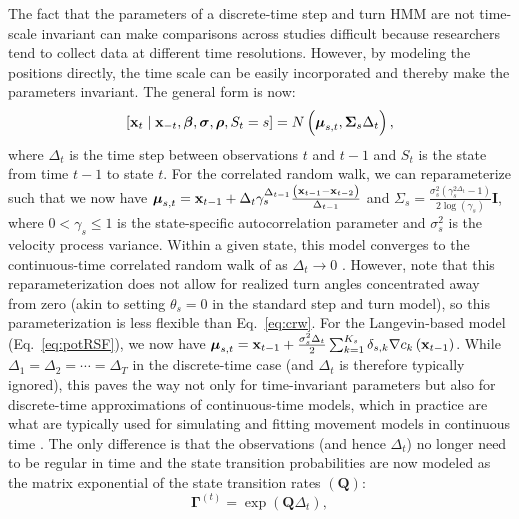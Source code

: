\documentclass[12pt]{article}\usepackage[]{graphicx}\usepackage[]{xcolor}
\begin{document}
The fact that the parameters of a discrete-time step and turn HMM are not time-scale invariant can make comparisons across studies difficult because researchers tend to collect data at different time resolutions. However, by modeling the positions directly, the time scale can be easily incorporated and thereby make the parameters invariant. The general form is now:
\begin{equation}
\label{eq:disApprox}
    [{\bf x}_t \mid {\bf x}_{-t}, \boldsymbol{\beta}, {\boldsymbol \sigma}, {\boldsymbol \rho}, S_t=s] = N\left(\boldsymbol{\mu}_{s,t},{\boldsymbol \Sigma}_s \Delta_t \right),
\end{equation}
where $\Delta_t$ is the time step between observations $t$ and $t-1$ and $S_t$ is the state from time $t-1$ to state $t$. For the correlated random walk, we can reparameterize such that we now have $\boldsymbol{\mu}_{s,t}={\bf x}_{t-1}+\Delta_t \gamma_s^{\Delta_{t-1}} \frac{\left({\bf x}_{t-1}-{\bf x}_{t-2}\right)}{\Delta_{t-1}}$ and $\Sigma_s=\frac{\sigma^2_s \left(\gamma_s^{2 \Delta_t}-1\right)}{2 \log \left(\gamma_s\right)} \mathbf{I}$, where $0 < \gamma_s \leq 1$ is the state-specific autocorrelation parameter and $\sigma_s^2$ is the velocity process variance. Within a given state, this model converges to the continuous-time correlated random walk of \cite{JohnsonEtAl2008} as $\Delta_t \to 0$ \citep[e.g.,][]{albertsen2019generalizing}. However, note that this reparameterization does not allow for realized turn angles concentrated away from zero (akin to setting $\theta_s=0$ in the standard step and turn model), so this parameterization is less flexible than Eq.\ \ref{eq:crw}. For the Langevin-based model (Eq.\ \ref{eq:potRSF}), we now have ${\boldsymbol \mu}_{s,t} = {\bf x}_{t-1} + \frac{\sigma_s^2 \Delta_t}{2} \sum_{k=1}^{K_s} \delta_{s,k} \nabla c_k\left({\bf x}_{t-1}\right)$. While $\Delta_1 = \Delta_2 = \cdots = \Delta_T$ in the discrete-time case (and $\Delta_t$ is therefore typically ignored), this paves the way not only for time-invariant parameters but also for discrete-time approximations of continuous-time models, which in practice are what are typically used for simulating and fitting movement models in continuous time \citep[e.g.,][]{HootenEtAl2017,HootenEtAl2019,MichelotEtAl2019}. The only difference is that the observations (and hence $\Delta_t$) no longer need to be regular in time and the state transition probabilities are now modeled as the matrix exponential of the state transition rates $\left(\mathbf{Q}\right)$: 
\begin{equation}
  \boldsymbol{\Gamma}^{(t)} = \exp \left(\mathbf{Q} \Delta_t \right),
\end{equation}
\end{document}
